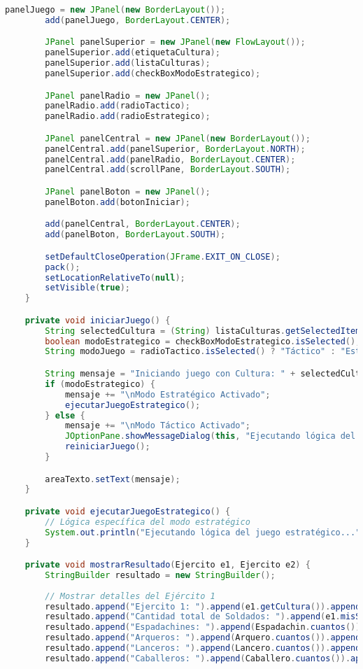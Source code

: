 \documentclass{article}
\begin{document}
\begin{itemize}
\begin{lstlisting}[language=java]
        panelJuego = new JPanel(new BorderLayout());
        add(panelJuego, BorderLayout.CENTER);

        JPanel panelSuperior = new JPanel(new FlowLayout());
        panelSuperior.add(etiquetaCultura);
        panelSuperior.add(listaCulturas);
        panelSuperior.add(checkBoxModoEstrategico);

        JPanel panelRadio = new JPanel();
        panelRadio.add(radioTactico);
        panelRadio.add(radioEstrategico);

        JPanel panelCentral = new JPanel(new BorderLayout());
        panelCentral.add(panelSuperior, BorderLayout.NORTH);
        panelCentral.add(panelRadio, BorderLayout.CENTER);
        panelCentral.add(scrollPane, BorderLayout.SOUTH);

        JPanel panelBoton = new JPanel();
        panelBoton.add(botonIniciar);

        add(panelCentral, BorderLayout.CENTER);
        add(panelBoton, BorderLayout.SOUTH);

        setDefaultCloseOperation(JFrame.EXIT_ON_CLOSE);
        pack();
        setLocationRelativeTo(null);
        setVisible(true);
    }

    private void iniciarJuego() {
        String selectedCultura = (String) listaCulturas.getSelectedItem();
        boolean modoEstrategico = checkBoxModoEstrategico.isSelected();
        String modoJuego = radioTactico.isSelected() ? "Táctico" : "Estratégico";

        String mensaje = "Iniciando juego con Cultura: " + selectedCultura + "\nModo de Juego: " + modoJuego;
        if (modoEstrategico) {
            mensaje += "\nModo Estratégico Activado";
            ejecutarJuegoEstrategico();
        } else {
            mensaje += "\nModo Táctico Activado";
            JOptionPane.showMessageDialog(this, "Ejecutando lógica del juego táctico...", "Modo Táctico", JOptionPane.INFORMATION_MESSAGE);
            reiniciarJuego();
        }

        areaTexto.setText(mensaje);
    }

    private void ejecutarJuegoEstrategico() {
        // Lógica específica del modo estratégico
        System.out.println("Ejecutando lógica del juego estratégico...");
    }

    private void mostrarResultado(Ejercito e1, Ejercito e2) {
        StringBuilder resultado = new StringBuilder();
        
        // Mostrar detalles del Ejército 1
        resultado.append("Ejercito 1: ").append(e1.getCultura()).append("\n");
        resultado.append("Cantidad total de Soldados: ").append(e1.misSoldados.size()).append("\n");
        resultado.append("Espadachines: ").append(Espadachin.cuantos()).append("\n");
        resultado.append("Arqueros: ").append(Arquero.cuantos()).append("\n");
        resultado.append("Lanceros: ").append(Lancero.cuantos()).append("\n");
        resultado.append("Caballeros: ").append(Caballero.cuantos()).append("\n\n");
    

\end{lstlisting}
\end{itemize}
\end{document}
